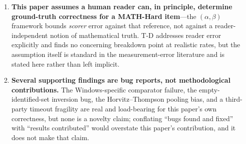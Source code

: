 \begin{enumerate}
  \item \textbf{This paper assumes a human reader can, in principle,
  determine ground-truth correctness for a MATH-Hard item}---the
  $(\alpha,\beta)$ framework bounds \emph{scorer} error against that
  reference, not against a reader-independent notion of mathematical truth.
  T-D addresses reader error explicitly and finds no concerning breakdown
  point at realistic rates, but the assumption itself is standard in the
  measurement-error literature and is stated here rather than left
  implicit.

  \item \textbf{Several supporting findings are bug reports, not
  methodological contributions.} The Windows-specific comparator failure,
  the empty-identified-set inversion bug, the Horvitz--Thompson pooling
  bias, and a third-party timeout fragility are real and load-bearing for
  this paper's own correctness, but none is a novelty claim; conflating
  ``bugs found and fixed'' with ``results contributed'' would overstate
  this paper's contribution, and it does not make that claim.
\end{enumerate}

